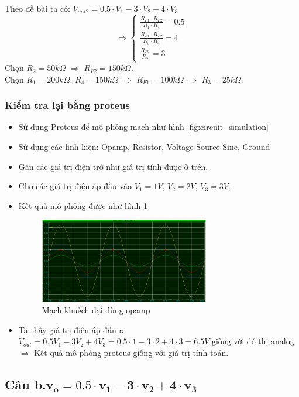 \documentclass[12pt,a4paper]{article}
\begin{document}
				\hspace*{0.6cm}Theo đề bài ta có: $V_{out2} = 0.5 \cdot V_1 - 3 \cdot V_2 + 4 \cdot V_3$
				\[
				\Rightarrow
				\begin{cases}
					\frac{R_{F1} \cdot R_{F2}}{R_1 \cdot R_4} = 0.5\\
					\frac{R_{F1} \cdot R_{F2}}{R_3 \cdot R_4} = 4\\
					\frac{R_{F2}}{R_2} = 3
				\end{cases}
				\]
				\hspace*{0.6cm}Chọn $R_{2} = 50k\Omega$ $\Rightarrow$ $R_{F2} = 150k\Omega$.\\
				\hspace*{0.6cm}Chọn $R_{1} = 200k\Omega$, $R_{4} = 150k\Omega$ $\Rightarrow$ $R_{F1} = 100k\Omega$ $\Rightarrow$ $R_3 = 25k\Omega$.\\
			\newpage
			\subsubsection{Kiểm tra lại bằng proteus}
				\begin{itemize}
					\item Sử dụng Proteus để mô phỏng mạch như hình \ref{fig:circuit_simulation}
					\item Sử dụng các linh kiện: Opamp, Resistor, Voltage Source Sine, Ground
					\item Gán các giá trị điện trở như giá trị tính được ở trên.
					\item Cho các giá trị điện áp đầu vào $V_1 = 1V$, $V_2 = 2V$, $V_3 = 3V$.
					\item Kết quả mô phỏng được như hình \ref{fig:result_simulation}
					\begin{figure}[H]
						\centering
						\includegraphics[width=0.7\textwidth]{pictures/result1_a.png}
						\caption{Mạch khuếch đại dùng opamp}					
						\label{fig:result_simulation}
					\end{figure}
					\item Ta thấy giá trị điện áp đầu ra $V_{out} = 0.5V_1 - 3V_2 + 4V_3 = 0.5 \cdot 1 - 3 \cdot 2 + 4 \cdot 3 = 6.5V$ giống với đồ thị analog $\Rightarrow$ Kết quả mô phỏng proteus giống với giá trị tính toán.
				\end{itemize}
		\subsection{Câu b.$\mathbf{v_o = 0.5 \cdot v_1 - 3 \cdot v_2 + 4 \cdot v_3}$}
\end{document}
